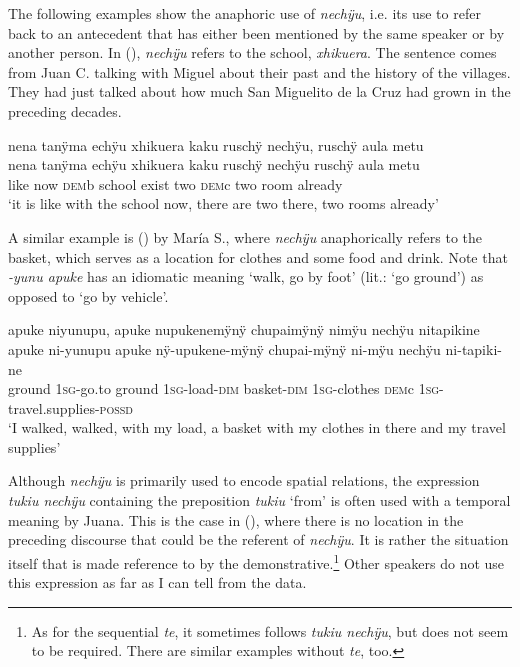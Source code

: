The following examples show the anaphoric use of \textit{nechÿu}, i.e. its use to refer back to an antecedent that has either been mentioned by the same speaker or by another person. In (), \textit{nechÿu} refers to the school, \textit{xhikuera}. The sentence comes from Juan C. talking with Miguel about their past and the history of the villages. They had just talked about how much San Miguelito de la Cruz had grown in the preceding decades.

\ea\label{ex:demC-6}
\begingl
\glpreamble nena tanÿma echÿu xhikuera kaku ruschÿ nechÿu, ruschÿ aula metu \\
\gla nena tanÿma echÿu xhikuera kaku ruschÿ nechÿu ruschÿ aula metu\\
\glb like now \textsc{dem}b school exist two \textsc{dem}c two room already\\
\glft ‘it is like with the school now, there are two there, two rooms already’
\endgl
\trailingcitation{[mqx-p110826l.184-186]}
\xe

A similar example is () by María S., where \textit{nechÿu} anaphorically refers to the basket, which serves as a location for clothes and some food and drink. Note that \textit{-yunu apuke} has an idiomatic meaning ‘walk, go by foot’ (lit.: ‘go ground’) as opposed to ‘go by vehicle’. 


\ea\label{ex:nechÿu-1}
\begingl
\glpreamble apuke niyunupu, apuke nupukenemÿnÿ chupaimÿnÿ nimÿu nechÿu nitapikine\\
\gla apuke ni-yunupu apuke nÿ-upukene-mÿnÿ chupai-mÿnÿ ni-mÿu nechÿu ni-tapiki-ne\\
\glb ground 1\textsc{sg}-go.to ground 1\textsc{sg}-load-\textsc{dim} basket-\textsc{dim} 1\textsc{sg}-clothes \textsc{dem}c 1\textsc{sg}-travel.supplies-\textsc{possd}\\
\glft ‘I walked, walked, with my load, a basket with my clothes in there and my travel supplies’
\endgl
\trailingcitation{[rxx-p181101l-2.036-038]}
\xe


Although \textit{nechÿu} is primarily used to encode spatial relations, the expression \textit{tukiu nechÿu} containing the  preposition \textit{tukiu} ‘from’ is often used with a temporal meaning by Juana. This is the case in (), where there is no location in the preceding discourse that could be the referent of \textit{nechÿu}. It is rather the situation itself that is made reference to by the demonstrative.\footnote{As for the sequential  \textit{te}, it sometimes follows \textit{tukiu nechÿu}, but does not seem to be required. There are similar examples without \textit{te}, too.} Other speakers do not use this expression as far as I can tell from the data.


